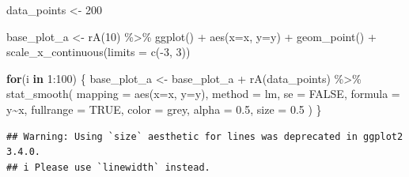 \documentclass[
]{book}
\newenvironment{Shaded}{\begin{snugshade}}{\end{snugshade}}
\newcommand{\AttributeTok}[1]{\textcolor[rgb]{0.77,0.63,0.00}{#1}}
\newcommand{\ConstantTok}[1]{\textcolor[rgb]{0.00,0.00,0.00}{#1}}
\newcommand{\ControlFlowTok}[1]{\textcolor[rgb]{0.13,0.29,0.53}{\textbf{#1}}}
\newcommand{\DecValTok}[1]{\textcolor[rgb]{0.00,0.00,0.81}{#1}}
\newcommand{\FloatTok}[1]{\textcolor[rgb]{0.00,0.00,0.81}{#1}}
\newcommand{\FunctionTok}[1]{\textcolor[rgb]{0.00,0.00,0.00}{#1}}
\newcommand{\NormalTok}[1]{#1}
\newcommand{\OtherTok}[1]{\textcolor[rgb]{0.56,0.35,0.01}{#1}}
\newcommand{\SpecialCharTok}[1]{\textcolor[rgb]{0.00,0.00,0.00}{#1}}
\newcommand{\StringTok}[1]{\textcolor[rgb]{0.31,0.60,0.02}{#1}}
\theoremstyle{definition}
\theoremstyle{definition}
\theoremstyle{definition}
\theoremstyle{definition}
\theoremstyle{remark}
\begin{document}
\begin{Shaded}
\begin{Highlighting}[]
\NormalTok{data\_points }\OtherTok{\textless{}{-}} \DecValTok{200}

\NormalTok{base\_plot\_a }\OtherTok{\textless{}{-}} \FunctionTok{rA}\NormalTok{(}\DecValTok{10}\NormalTok{) }\SpecialCharTok{\%\textgreater{}\%}  
  \FunctionTok{ggplot}\NormalTok{() }\SpecialCharTok{+} 
  \FunctionTok{aes}\NormalTok{(}\AttributeTok{x=}\NormalTok{x, }\AttributeTok{y=}\NormalTok{y) }\SpecialCharTok{+} 
  \FunctionTok{geom\_point}\NormalTok{() }\SpecialCharTok{+} 
  \FunctionTok{scale\_x\_continuous}\NormalTok{(}\AttributeTok{limits =} \FunctionTok{c}\NormalTok{(}\SpecialCharTok{{-}}\DecValTok{3}\NormalTok{, }\DecValTok{3}\NormalTok{))}

\ControlFlowTok{for}\NormalTok{(i }\ControlFlowTok{in} \DecValTok{1}\SpecialCharTok{:}\DecValTok{100}\NormalTok{) \{ }
\NormalTok{    base\_plot\_a }\OtherTok{\textless{}{-}}\NormalTok{ base\_plot\_a }\SpecialCharTok{+} \FunctionTok{rA}\NormalTok{(data\_points) }\SpecialCharTok{\%\textgreater{}\%} 
      \FunctionTok{stat\_smooth}\NormalTok{(}
        \AttributeTok{mapping =} \FunctionTok{aes}\NormalTok{(}\AttributeTok{x=}\NormalTok{x, }\AttributeTok{y=}\NormalTok{y), }
        \AttributeTok{method  =} \StringTok{\textquotesingle{}lm\textquotesingle{}}\NormalTok{,         }\AttributeTok{se =} \ConstantTok{FALSE}\NormalTok{, }
        \AttributeTok{formula =} \StringTok{\textquotesingle{}y\textasciitilde{}x\textquotesingle{}}\NormalTok{, }\AttributeTok{fullrange =} \ConstantTok{TRUE}\NormalTok{,}
        \AttributeTok{color   =} \StringTok{\textquotesingle{}grey\textquotesingle{}}\NormalTok{,    }\AttributeTok{alpha =} \FloatTok{0.5}\NormalTok{,}
        \AttributeTok{size    =} \FloatTok{0.5}
\NormalTok{      )}
\NormalTok{\}}
\end{Highlighting}
\end{Shaded}

\begin{verbatim}
## Warning: Using `size` aesthetic for lines was deprecated in ggplot2 3.4.0.
## i Please use `linewidth` instead.
\end{verbatim}
\end{document}
